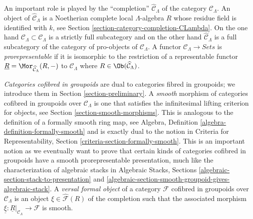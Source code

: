 \medskip\noindent
An important role is played by the ``completion''
$\widehat{\mathcal{C}}_\Lambda$ of the category $\mathcal{C}_\Lambda$.
An object of $\widehat{\mathcal{C}}_\Lambda$ is a Noetherian complete
local $\Lambda$-algebra $R$ whose residue field is identified with $k$, see
Section \ref{section-category-completion-CLambda}.
On the one hand $\mathcal{C}_\Lambda \subset \widehat{\mathcal{C}}_\Lambda$
is a strictly full subcategory and on the other hand
$\widehat{\mathcal{C}}_\Lambda$ is a full subcategory of the category
of pro-objects of $\mathcal{C}_\Lambda$. A functor
$\mathcal{C}_\Lambda \to \textit{Sets}$ is {\it prorepresentable}
if it is isomorphic to the restriction of a representable functor
$\underline{R} = \Mor_{\widehat{\mathcal{C}}_\Lambda}(R, -)$
to $\mathcal{C}_\Lambda$ where
$R \in \Ob(\widehat{\mathcal{C}}_\Lambda)$.

\medskip\noindent
{\it Categories cofibred in groupoids} are dual to categories fibred in
groupoids; we introduce them in Section \ref{section-preliminary}.
A {\it smooth} morphism of categories cofibred in groupoids over
$\mathcal{C}_\Lambda$ is one that satisfies the infinitesimal lifting
criterion for objects, see
Section \ref{section-smooth-morphisms}.
This is analogous to the definition of a formally smooth ring map, see
Algebra, Definition \ref{algebra-definition-formally-smooth}
and is exactly dual to the notion in
Criteria for Representability, Section \ref{criteria-section-formally-smooth}.
This is an important notion as we eventually want to prove that certain
kinds of categories cofibred in groupoids have a smooth prorepresentable
presentation, much like the characterization of algebraic stacks in
Algebraic Stacks, Sections \ref{algebraic-section-stack-to-presentation} and
\ref{algebraic-section-smooth-groupoid-gives-algebraic-stack}.
A {\it versal formal object} of a category $\mathcal{F}$ cofibred
in groupoids over $\mathcal{C}_\Lambda$ is an object
$\xi \in \widehat{\mathcal{F}}(R)$ of the completion such that the
associated morphism
$\underline{\xi} : \underline{R}|_{\mathcal{C}_\Lambda} \to \mathcal{F}$
is smooth.

